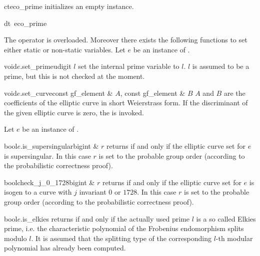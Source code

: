 \begin{fcode}{ct}{eco_prime}{}
  initializes an empty instance.
\end{fcode}

\begin{fcode}{dt}{~eco_prime}{}
\end{fcode}



\ASGN

The operator \code{=} is overloaded.  Moreover there exists the following functions to set
either static or non-static variables.  Let $e$ be an instance of .

\begin{fcode}{void}{$e$.set_prime}{udigit $l$}
  set the internal prime variable to $l$.  $l$ is assumed to be a prime, but this is not checked
  at the moment.
\end{fcode}

\begin{fcode}{void}{$e$.set_curve}{const gf_element & $A$, const gf_element & $B$}
  $A$ and $B$ are the coefficients of the elliptic curve in short Weierstrass form.  If the
  discriminant of the given elliptic curve is zero, the \LEH is invoked.
\end{fcode}



\ACCS

Let $e$ be an instance of .

\begin{fcode}{bool}{$e$.is_supersingular}{bigint & $r$}
  returns \TRUE if and only if the elliptic curve set for $e$ is supersingular.  In this case
  $r$ is set to the probable group order (according to the probabilistic correctness proof).
\end{fcode}

\begin{fcode}{bool}{check_j_0_1728}{bigint & $r$}
  returns \TRUE if and only if the elliptic curve set for $e$ is isogen to a curve with $j$
  invariant $0$ or $1728$.  In this case $r$ is set to the probable group order (according to
  the probabilistic correctness proof).
\end{fcode}

\begin{fcode}{bool}{$e$.is_elkies}{}
  returns \TRUE if and only if the actually used prime $l$ is a so called Elkies prime, i.e.
  the characteristic polynomial of the Frobenius endomorphism splits modulo $l$.  It is assumed
  that the splitting type of the corresponding $l$-th modular polynomial has already been
  computed.
\end{fcode}

